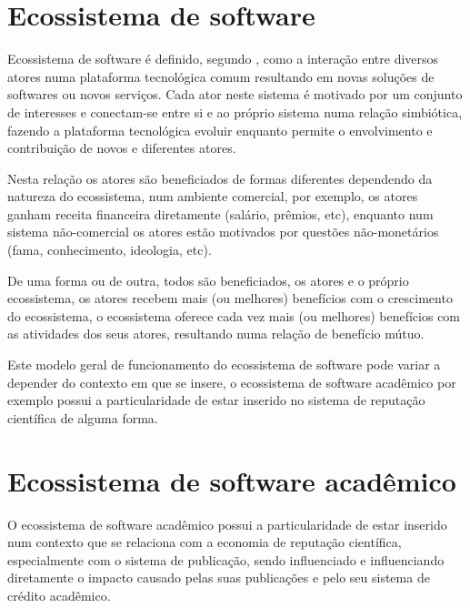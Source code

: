\section{Ecossistema de software}


Ecossistema de software é definido, segundo ,
como a interação entre diversos atores numa plataforma tecnológica comum
resultando em novas soluções de softwares ou novos serviços. Cada ator neste
sistema é motivado por um conjunto de interesses e conectam-se entre si e ao
próprio sistema numa relação simbiótica, fazendo a plataforma tecnológica
evoluir enquanto permite o envolvimento e contribuição de novos e diferentes
atores.

Nesta relação os atores são beneficiados de formas diferentes dependendo da
natureza do ecossistema, num ambiente comercial, por exemplo, os atores ganham
receita financeira diretamente (salário, prêmios, etc), enquanto num sistema
não-comercial os atores estão motivados por questões não-monetários (fama,
conhecimento, ideologia, etc).

De uma forma ou de outra, todos são beneficiados, os atores e o próprio
ecossistema, os atores recebem mais (ou melhores) benefícios com o crescimento
do ecossistema, o ecossistema oferece cada vez mais (ou melhores) benefícios
com as atividades dos seus atores, resultando numa relação de benefício
mútuo.

Este modelo geral de funcionamento do ecossistema de software pode variar a
depender do contexto em que se insere, o ecossistema de software acadêmico por
exemplo possui a particularidade de estar inserido no sistema de reputação
científica de alguma forma.

\section{Ecossistema de software acadêmico}

O ecossistema de software acadêmico possui a particularidade de estar inserido
num contexto que se relaciona com a economia de reputação científica,
especialmente com o sistema de publicação, sendo influenciado e influenciando
diretamente o impacto causado pelas suas publicações e pelo seu sistema de crédito
acadêmico.


